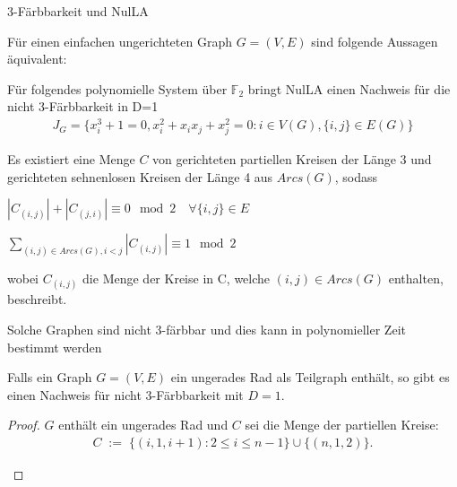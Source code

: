 \begin{mslide}{3-Färbbarkeit und NulLA}
\begin{thm} \label{3colorTheorem}
Für einen einfachen ungerichteten Graph $G=(V,E)$ sind folgende Aussagen äquivalent:
\begin{compactenum}[1.]
	\item Für folgendes polynomielle System über $\mathbb{F}_2$ bringt NulLA einen Nachweis für die nicht 3-Färbbarkeit in D=1
	\begin{align*}
	J_G = \{x_i^3+1=0,x_i^2+x_ix_j+x_j^2=0:i\in V(G),\{i,j\}\in E(G)\}
	\end{align*}
	\item Es existiert eine Menge $C$ von gerichteten partiellen Kreisen der Länge 3 und gerichteten sehnenlosen Kreisen der Länge 4 aus $Arcs(G)$, sodass 
	\begin{compactenum}[a)]
		\item  $\left|C_{(i,j)}\right|+\left|C_{(j,i)}\right| \equiv 0 \mod{2} \quad \forall \{i,j\} \in E$
		\item $\sum_{(i,j) \in Arcs(G), i < j} \left|C_{(i,j)}\right| \equiv 1 \mod{2}$
	\end{compactenum}
	wobei $C_{(i,j)}$ die Menge der Kreise in C, welche $(i,j) \in Arcs(G)$ enthalten, beschreibt.
\end{compactenum}
Solche Graphen sind nicht 3-färbbar und dies kann in polynomieller Zeit bestimmt werden
\end{thm}

\framebreak

\begin{kor}
Falls ein Graph $G=(V,E)$ ein ungerades Rad als Teilgraph enthält, so gibt es einen Nachweis für nicht 3-Färbbarkeit mit $D=1$.
\end{kor} 

\begin{proof}
$G$ enthält ein ungerades Rad und $C$ sei die Menge der partiellen Kreise:
\begin{align*}
C\;:=\;\{(i,1,i+1):2\le i \le n-1\}\cup\{(n,1,2)\}.
\end{align*}
	\begin{figure}[htp]
\begin{center}
\end{center}
\end{figure}
\end{proof}
\end{mslide}
